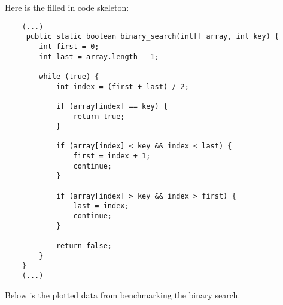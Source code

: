 \documentclass[a4paper,11pt]{article}
\begin{document}
Here is the filled in code skeleton:

\begin{verbatim}
    (...)
     public static boolean binary_search(int[] array, int key) {
        int first = 0;
        int last = array.length - 1;

        while (true) {
            int index = (first + last) / 2;

            if (array[index] == key) {
                return true;
            }

            if (array[index] < key && index < last) {
                first = index + 1;
                continue;
            }

            if (array[index] > key && index > first) {
                last = index;
                continue;
            }

            return false;
        }
    }
    (...)
\end{verbatim}   

Below is the plotted data from benchmarking the binary search.
\end{document}
